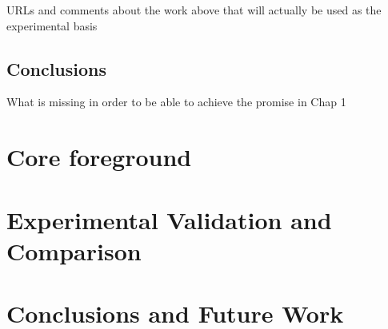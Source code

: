 \documentclass[12pt,a4paper]{report}
\begin{document}
	URLs and comments about the work above that will actually be used as 
	the experimental basis
	\\
		
	\section{Conclusions}
	\label{sec:bg:concl}
	
	What is missing in order to be able to achieve the promise in Chap 1
	
	
	\chapter{Core foreground}
	\label{sec:fg}
	
	\chapter{Experimental Validation and Comparison}
	\label{sec:exp}
	
	\chapter{Conclusions and Future Work}
	\label{sec:concl}
	
	\renewcommand{\bibname}{References}
	
	
\end{document}
